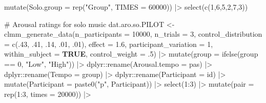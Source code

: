 \documentclass[
  bookmarksnumbered]{article}
\newenvironment{Shaded}{\begin{snugshade}}{\end{snugshade}}
\newcommand{\AttributeTok}[1]{\textcolor[rgb]{0.80,0.80,0.80}{#1}}
\newcommand{\CommentTok}[1]{\textcolor[rgb]{0.50,0.62,0.50}{#1}}
\newcommand{\ConstantTok}[1]{\textcolor[rgb]{0.86,0.64,0.64}{\textbf{#1}}}
\newcommand{\DecValTok}[1]{\textcolor[rgb]{0.86,0.86,0.80}{#1}}
\newcommand{\FloatTok}[1]{\textcolor[rgb]{0.75,0.75,0.82}{#1}}
\newcommand{\FunctionTok}[1]{\textcolor[rgb]{0.94,0.94,0.56}{#1}}
\newcommand{\NormalTok}[1]{\textcolor[rgb]{0.80,0.80,0.80}{#1}}
\newcommand{\OtherTok}[1]{\textcolor[rgb]{0.94,0.94,0.56}{#1}}
\newcommand{\SpecialCharTok}[1]{\textcolor[rgb]{0.86,0.64,0.64}{#1}}
\newcommand{\StringTok}[1]{\textcolor[rgb]{0.80,0.58,0.58}{#1}}
\begin{document}
\begin{Shaded}
\begin{Highlighting}[]
  \FunctionTok{mutate}\NormalTok{(}\AttributeTok{Solo.group =} \FunctionTok{rep}\NormalTok{(}\StringTok{"Group"}\NormalTok{, }\AttributeTok{TIMES =} \DecValTok{60000}\NormalTok{)) }\SpecialCharTok{|\textgreater{}}
  \FunctionTok{select}\NormalTok{(}\FunctionTok{c}\NormalTok{(}\DecValTok{1}\NormalTok{,}\DecValTok{6}\NormalTok{,}\DecValTok{5}\NormalTok{,}\DecValTok{2}\NormalTok{,}\DecValTok{7}\NormalTok{,}\DecValTok{3}\NormalTok{))}

\CommentTok{\# Arousal ratings for solo music}
\NormalTok{dat.aro.so.PILOT }\OtherTok{\textless{}{-}} \FunctionTok{clmm\_generate\_data}\NormalTok{(}\AttributeTok{n\_participants =} \DecValTok{10000}\NormalTok{,}
                                 \AttributeTok{n\_trials =} \DecValTok{3}\NormalTok{,}
                                 \AttributeTok{control\_distribution =} \FunctionTok{c}\NormalTok{(.}\DecValTok{43}\NormalTok{, .}\DecValTok{41}\NormalTok{, .}\DecValTok{14}\NormalTok{, .}\DecValTok{01}\NormalTok{, .}\DecValTok{01}\NormalTok{),}
                                 \AttributeTok{effect =} \FloatTok{1.6}\NormalTok{,}
                                 \AttributeTok{participant\_variation =} \DecValTok{1}\NormalTok{,}
                                 \AttributeTok{within\_subject =} \ConstantTok{TRUE}\NormalTok{,}
                                 \AttributeTok{control\_weight =}\NormalTok{ .}\DecValTok{5}\NormalTok{) }\SpecialCharTok{|\textgreater{}}
  \FunctionTok{mutate}\NormalTok{(}\AttributeTok{group =} \FunctionTok{ifelse}\NormalTok{(group }\SpecialCharTok{==} \DecValTok{0}\NormalTok{, }\StringTok{"Low"}\NormalTok{, }\StringTok{"High"}\NormalTok{)) }\SpecialCharTok{|\textgreater{}}
\NormalTok{  dplyr}\SpecialCharTok{::}\FunctionTok{rename}\NormalTok{(}\AttributeTok{Arousal.tempo =}\NormalTok{ pas) }\SpecialCharTok{|\textgreater{}}
\NormalTok{  dplyr}\SpecialCharTok{::}\FunctionTok{rename}\NormalTok{(}\AttributeTok{Tempo =}\NormalTok{ group) }\SpecialCharTok{|\textgreater{}}
\NormalTok{  dplyr}\SpecialCharTok{::}\FunctionTok{rename}\NormalTok{(}\AttributeTok{Participant =}\NormalTok{ id) }\SpecialCharTok{|\textgreater{}}
  \FunctionTok{mutate}\NormalTok{(}\AttributeTok{Participant =} \FunctionTok{paste0}\NormalTok{(}\StringTok{"p"}\NormalTok{, Participant)) }\SpecialCharTok{|\textgreater{}}
  \FunctionTok{select}\NormalTok{(}\DecValTok{1}\SpecialCharTok{:}\DecValTok{3}\NormalTok{) }\SpecialCharTok{|\textgreater{}}
  \FunctionTok{mutate}\NormalTok{(}\AttributeTok{pair =} \FunctionTok{rep}\NormalTok{(}\DecValTok{1}\SpecialCharTok{:}\DecValTok{3}\NormalTok{, }\AttributeTok{times =} \DecValTok{20000}\NormalTok{)) }\SpecialCharTok{|\textgreater{}}

\end{Highlighting}
\end{Shaded}
\end{document}
